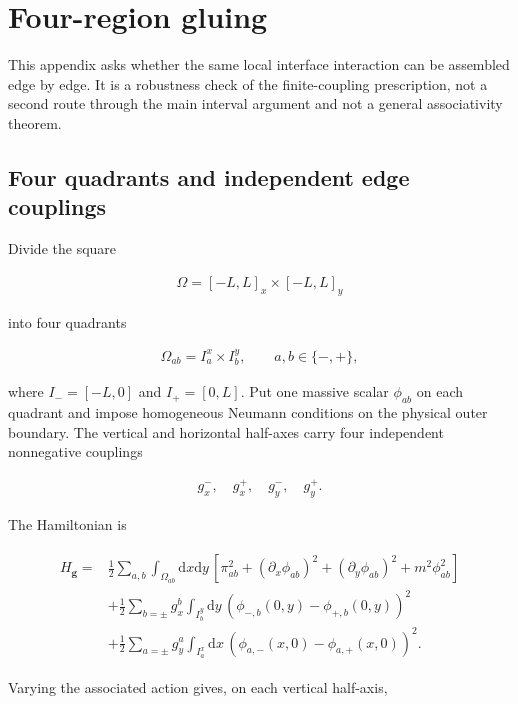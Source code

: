 \section{Four-region gluing}\label{app:four-regions}

This appendix asks whether the same local interface interaction can be assembled edge by edge. It is a robustness check of the finite-coupling prescription, not a second route through the main interval argument and not a general associativity theorem.

\subsection{Four quadrants and independent edge couplings}\label{subsec:four-region-edges}

Divide the square

\begin{align}
\Omega=[-L,L]_x\times[-L,L]_y
\end{align}

into four quadrants

\begin{align}
\Omega_{ab}=I_a^x\times I_b^y,
\qquad
a,b\in\{-,+\},
\end{align}

where $I_-=[-L,0]$ and $I_+=[0,L]$. Put one massive scalar $\phi_{ab}$ on each quadrant and impose homogeneous Neumann conditions on the physical outer boundary. The vertical and horizontal half-axes carry four independent nonnegative couplings

\begin{align}
g_x^-,\quad g_x^+,\quad g_y^-,\quad g_y^+.
\end{align}

The Hamiltonian is

\begin{align}
\begin{aligned}
H_{\boldsymbol g}
={}&\frac12\sum_{a,b}\int_{\Omega_{ab}}\mathrm dx\mathrm dy\,
\left[
\pi_{ab}^2+(\partial_x\phi_{ab})^2
+(\partial_y\phi_{ab})^2+m^2\phi_{ab}^2
\right]\\
&+\frac12\sum_{b=\pm}g_x^b\int_{I_b^y}\mathrm dy\,
\left(\phi_{-,b}(0,y)-\phi_{+,b}(0,y)\right)^2\\
&+\frac12\sum_{a=\pm}g_y^a\int_{I_a^x}\mathrm dx\,
\left(\phi_{a,-}(x,0)-\phi_{a,+}(x,0)\right)^2.
\end{aligned}
\end{align}

Varying the associated action gives, on each vertical half-axis,

